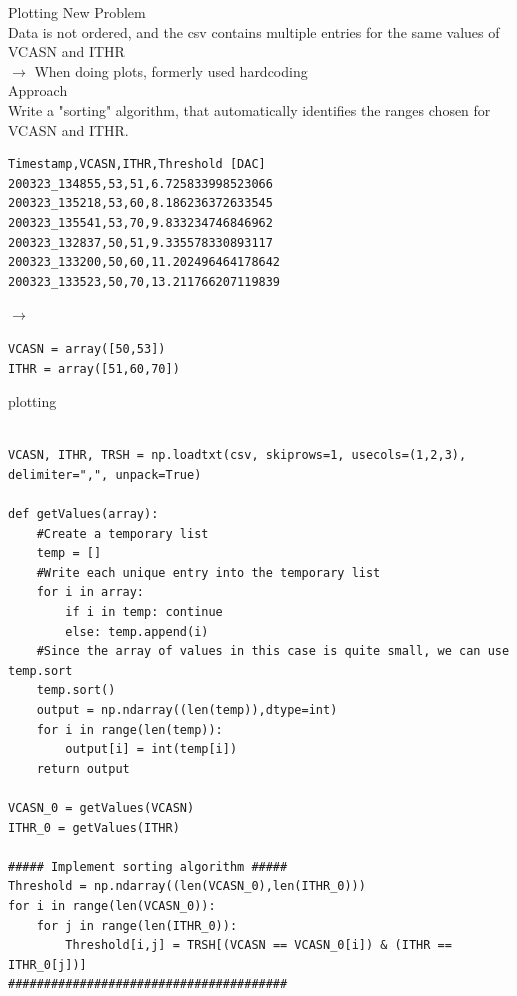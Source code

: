 \begin{frame}[fragile]{Plotting}
    \Large{New Problem}\\
    \normalsize
    Data is not ordered, and the csv contains multiple entries for the same
    values of VCASN and ITHR \\
    \pause
    $\rightarrow$ When doing plots, formerly used hardcoding\\[.5cm]
    \pause
    \Large{Approach}\\
    \normalsize
    Write a "sorting" algorithm, that automatically identifies the ranges chosen
    for VCASN and ITHR. \\
    \begin{minipage}{.49\textwidth}
    \begin{lstlisting}
Timestamp,VCASN,ITHR,Threshold [DAC]
200323_134855,53,51,6.725833998523066
200323_135218,53,60,8.186236372633545
200323_135541,53,70,9.833234746846962
200323_132837,50,51,9.335578330893117
200323_133200,50,60,11.202496464178642
200323_133523,50,70,13.211766207119839
    \end{lstlisting}
\end{minipage}
\begin{minipage}{.04\textwidth}
    \centering
    $\rightarrow$
\end{minipage}
\begin{minipage}{.45\textwidth}
    \begin{lstlisting}
VCASN = array([50,53])
ITHR = array([51,60,70])
    \end{lstlisting}
\end{minipage}
\end{frame}

\begin{frame}[fragile]{plotting}
    \begin{lstlisting}

VCASN, ITHR, TRSH = np.loadtxt(csv, skiprows=1, usecols=(1,2,3), delimiter=",", unpack=True)

def getValues(array):
    #Create a temporary list
    temp = []
    #Write each unique entry into the temporary list
    for i in array:
        if i in temp: continue
        else: temp.append(i)
    #Since the array of values in this case is quite small, we can use temp.sort
    temp.sort()
    output = np.ndarray((len(temp)),dtype=int)
    for i in range(len(temp)):
        output[i] = int(temp[i])
    return output

VCASN_0 = getValues(VCASN)
ITHR_0 = getValues(ITHR)

##### Implement sorting algorithm #####
Threshold = np.ndarray((len(VCASN_0),len(ITHR_0)))
for i in range(len(VCASN_0)):
    for j in range(len(ITHR_0)):
        Threshold[i,j] = TRSH[(VCASN == VCASN_0[i]) & (ITHR == ITHR_0[j])]
#######################################

    \end{lstlisting}
\end{frame}

